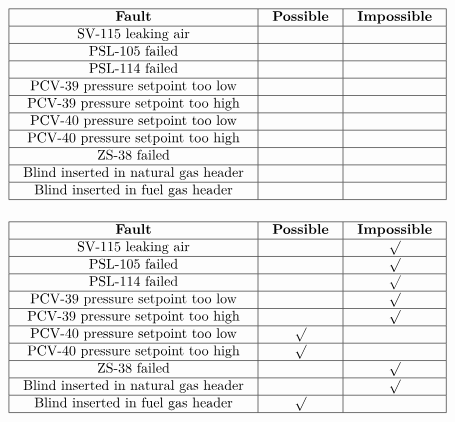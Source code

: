$$\vbox{\offinterlineskip
\halign{\strut
\vrule \quad\hfil # \ \hfil & 
\vrule \quad\hfil # \ \hfil & 
\vrule \quad\hfil # \ \hfil \vrule \cr
\noalign{\hrule}
%
{\bf Fault} & {\bf Possible} & {\bf Impossible} \cr
%
\noalign{\hrule}
%
SV-115 leaking air &  &  \cr
%
\noalign{\hrule}
%
PSL-105 failed &  &  \cr
%
\noalign{\hrule}
%
PSL-114 failed &  &  \cr
%
\noalign{\hrule}
%
PCV-39 pressure setpoint too low &  &  \cr
%
\noalign{\hrule}
%
PCV-39 pressure setpoint too high &  &  \cr
%
\noalign{\hrule}
%
PCV-40 pressure setpoint too low &  &  \cr
%
\noalign{\hrule}
%
PCV-40 pressure setpoint too high &  &  \cr
%
\noalign{\hrule}
%
ZS-38 failed &  &  \cr
%
\noalign{\hrule}
%
Blind inserted in natural gas header &  &  \cr
%
\noalign{\hrule}
%
Blind inserted in fuel gas header &  &  \cr
%
\noalign{\hrule}
} %
}$$ %








$$\vbox{\offinterlineskip
\halign{\strut
\vrule \quad\hfil # \ \hfil & 
\vrule \quad\hfil # \ \hfil & 
\vrule \quad\hfil # \ \hfil \vrule \cr
\noalign{\hrule}
%
{\bf Fault} & {\bf Possible} & {\bf Impossible} \cr
%
\noalign{\hrule}
%
SV-115 leaking air &  & $\surd$ \cr
%
\noalign{\hrule}
%
PSL-105 failed &  & $\surd$ \cr
%
\noalign{\hrule}
%
PSL-114 failed &  & $\surd$ \cr
%
\noalign{\hrule}
%
PCV-39 pressure setpoint too low &  & $\surd$ \cr
%
\noalign{\hrule}
%
PCV-39 pressure setpoint too high &  & $\surd$ \cr
%
\noalign{\hrule}
%
PCV-40 pressure setpoint too low & $\surd$ &  \cr
%
\noalign{\hrule}
%
PCV-40 pressure setpoint too high & $\surd$ &  \cr
%
\noalign{\hrule}
%
ZS-38 failed &  & $\surd$ \cr
%
\noalign{\hrule}
%
Blind inserted in natural gas header &  & $\surd$ \cr
%
\noalign{\hrule}
%
Blind inserted in fuel gas header & $\surd$ &  \cr
%
\noalign{\hrule}
} %
}$$ %






